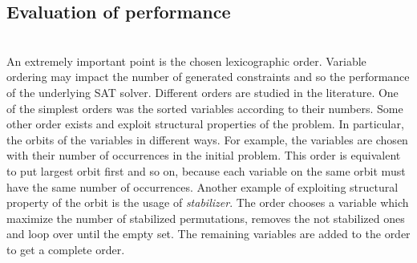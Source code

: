 \subsection{Evaluation of performance}




\\
An extremely important point is the chosen lexicographic order.
Variable ordering may impact the number of generated constraints and so the performance of
the underlying SAT solver. Different orders are studied in the literature. 
One of the simplest orders was the sorted variables according to their numbers.
Some other order exists and exploit structural properties of the 
problem. In particular, the orbits of the variables in different ways. For example, the variables are chosen 
with their number of occurrences in the initial problem. This order is equivalent to put largest orbit first
and so on, because each variable on the same orbit must have the same number of occurrences.
Another example of exploiting structural property of the orbit is the usage of \emph{stabilizer}.
The order chooses a variable which maximize the number of stabilized permutations, removes the not stabilized ones and loop over until the empty set. The remaining variables are added to the order to get a complete order.

%
%
%
%
%


